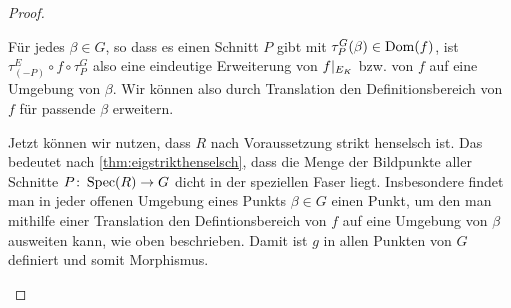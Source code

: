 \begin{Lemma}
\begin{proof}
\begin{description}
      Für jedes $\beta\in G$, so dass es einen Schnitt $P$ gibt mit
      $\tau_P^G(\beta)\in\operatorname{Dom}(f)$, ist $\tau_{(-P)}^E\circ f\circ
      \tau_P^G$ also eine eindeutige Erweiterung von $f|_{E_{K}}$
      bzw. von $f$ auf eine Umgebung von $\beta$.
      Wir können also durch Translation den Definitionsbereich von
      $f$ für passende $\beta$ erweitern.

      Jetzt können wir nutzen, dass $R$ nach Voraussetzung strikt
      henselsch ist. Das bedeutet nach
      \ref{thm:eigstrikthenselsch}, dass die Menge der Bildpunkte
      aller Schnitte $P\colon\operatorname{Spec}(R)\to G$ dicht in der
      speziellen Faser liegt.
      Insbesondere findet man in jeder offenen Umgebung eines
      Punkts $\beta\in G$ einen Punkt, um den man mithilfe einer
      Translation den Defintionsbereich von $f$ auf eine Umgebung von
      $\beta$ ausweiten kann, wie oben beschrieben.
      Damit ist $g$ in allen Punkten von $G$ definiert und somit
      Morphismus.
    \end{description}
  \end{proof}
\end{Lemma}


